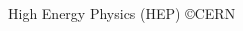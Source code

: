 \documentclass{beamer}
\begin{document}
{\begin{frame}{High Energy Physics (HEP) {\hfill \scriptsize \copyright CERN}}
\begin{columns}
\begin{column}{0.5\textwidth}
{\begin{figure}
    \end{figure}}
    \end{column}
\end{columns}

\end{frame}
}


{

}
\end{document}
